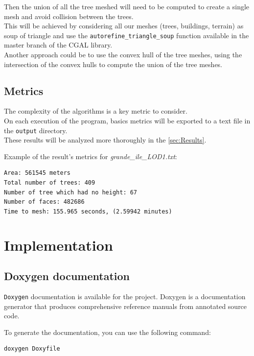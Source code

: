 \documentclass[12pt]{article}
\begin{document}
Then the union of all the tree meshed will need to be computed to create a single mesh
and avoid collision between the trees. \\
This will be achieved by considering all our meshes (trees, buildings, terrain) as
soup of triangle and  use the \texttt{autorefine\_triangle\_soup}\cite{auto-refine-triangle-soup}
function available in the master branch of the CGAL library. \\
Another approach could be to use the convex hull of the tree meshes, using the
intersection of the convex hulls to compute the union of the tree meshes.

\subsection{Metrics}
The complexity of the algorithms is a key metric to consider. \\
On each execution of the program, basics metrics will be exported to a text file in
the \texttt{output} directory. \\
These results will be analyzed more thoroughly in the \autoref{sec:Results}.

Example of the result's metrics for \textit{grande\_ile\_LOD1.txt}:

\begin{lstlisting}
Area: 561545 meters
Total number of trees: 409
Number of tree which had no height: 67
Number of faces: 482686
Time to mesh: 155.965 seconds, (2.59942 minutes)
\end{lstlisting}

\newpage

\section{Implementation}
\subsection{Doxygen documentation}

\texttt{Doxygen}\cite{doxygen} documentation is available for the project. Doxygen is a
documentation generator that produces comprehensive reference manuals from
annotated source code.

To generate the documentation, you can use the following command:

\begin{lstlisting}[language=bash]
doxygen Doxyfile
\end{lstlisting}
\end{document}

